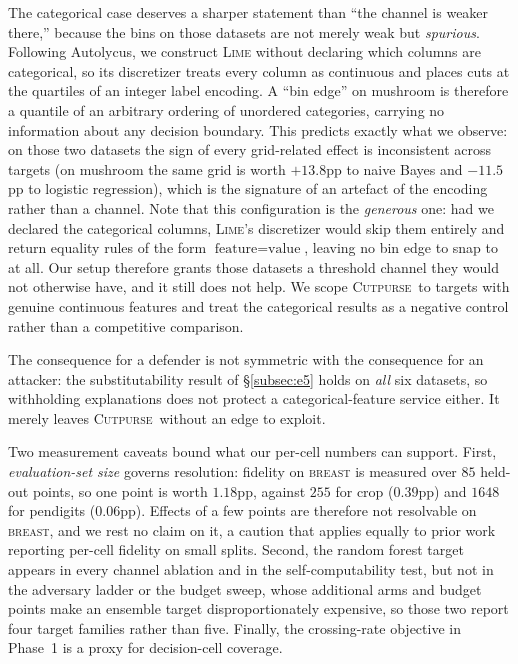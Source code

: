 \documentclass[sigconf,anonymous,review]{acmart}
\newcommand{\sys}{\textsc{Cutpurse}}
\begin{document}
The categorical case deserves a sharper statement than ``the channel is weaker there,'' because the
bins on those datasets are not merely weak but \emph{spurious}. Following Autolycus, we construct
\textsc{Lime} without declaring which columns are categorical, so its discretizer treats every column
as continuous and places cuts at the quartiles of an integer label encoding. A ``bin edge'' on
mushroom is therefore a quantile of an arbitrary ordering of unordered categories, carrying no
information about any decision boundary. This predicts exactly what we observe: on those two datasets
the sign of every grid-related effect is inconsistent across targets (on mushroom the same grid is worth $+13.8$pp to naive Bayes and $-11.5$pp to logistic regression), which is the signature of an
artefact of the encoding rather than a channel. Note that this configuration is the
\emph{generous} one: had we declared the categorical columns, \textsc{Lime}'s discretizer would skip
them entirely and return equality rules of the form $\text{feature}{=}\text{value}$, leaving no bin
edge to snap to at all. Our setup therefore grants those datasets a threshold channel they would not
otherwise have, and it still does not help. We scope \sys\ to targets with genuine continuous
features and treat the categorical results as a negative control rather than a competitive
comparison.

The consequence for a defender is not symmetric with the consequence for an attacker: the
substitutability result of \S\ref{subsec:e5} holds on \emph{all} six datasets, so withholding
explanations does not protect a categorical-feature service either. It merely leaves \sys\ without an
edge to exploit.

Two measurement caveats bound what our per-cell numbers can support. First, \emph{evaluation-set size}
governs resolution: fidelity on \textsc{breast} is measured over $85$ held-out points, so one point is
worth $1.18$pp, against $255$ for crop ($0.39$pp) and $1648$ for pendigits ($0.06$pp). Effects of a few
points are therefore not resolvable on \textsc{breast}, and we rest no claim on it, a caution that
applies equally to prior work reporting per-cell fidelity on small splits. Second, the random forest
target appears in every channel ablation and in the self-computability test, but not in the adversary
ladder or the budget sweep, whose additional arms and budget points make an ensemble target
disproportionately expensive, so those two report four target families rather than five. Finally, the
crossing-rate objective in Phase~1 is a proxy for decision-cell coverage.
\end{document}
